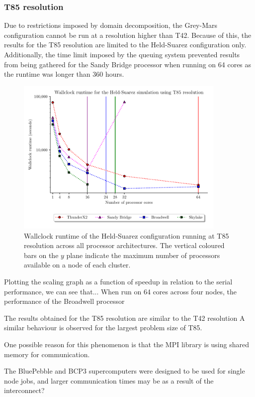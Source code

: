\documentclass[a4paper,11pt]{report}
\begin{document}
\subsubsection{T85 resolution}
Due to restrictions imposed by domain decomposition, the Grey-Mars configuration cannot be run at a resolution higher than T42. Because of this, the results for the T85 resolution are limited to the Held-Suarez configuration only. Additionally, the time limit imposed by the queuing system prevented results from being gathered for the Sandy Bridge processor when running on 64 cores as the runtime was longer than 360 hours. 
\par
\begin{figure}[htbp]
\begin{center}
\includegraphics[width=0.9\textwidth]{img/scaling_graph_T85_Held_suarez.pdf}
\caption{Wallclock runtime of the Held-Suarez configuration running at T85 resolution across all processor architectures. The vertical coloured bars on the $y$ plane indicate the maximum number of processors available on a node of each cluster.}
\label{fig:t85-scale}
\end{center}
\end{figure}
\par	
Plotting the scaling graph as a function of speedup in relation to the serial performance, we can see that...
When run on 64 cores across four nodes, the performance of the Broadwell processor 

The results obtained for the T85 resolution are similar to the T42 resolution
A similar behaviour is observed for the largest problem size of T85. 
\par
One possible reason for this phenomenon is that the MPI library is using shared memory for communication. 
\par
The BluePebble and BCP3 supercomputers were designed to be used for single node jobs, and larger communication times may be as a result of the interconnect? 
\end{document}

